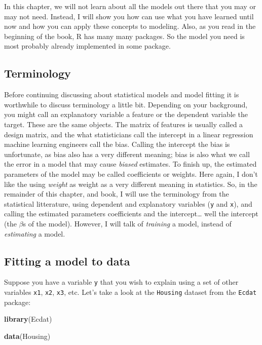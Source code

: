\documentclass[]{gitbook}
\newenvironment{Shaded}{\begin{snugshade}}{\end{snugshade}}
\newcommand{\KeywordTok}[1]{\textcolor[rgb]{0.13,0.29,0.53}{\textbf{#1}}}
\newcommand{\NormalTok}[1]{#1}
\theoremstyle{definition}
\theoremstyle{definition}
\theoremstyle{definition}
\theoremstyle{remark}
\begin{document}
In this chapter, we will not learn about all the models out there that
you may or may not need. Instead, I will show you how can use what you
have learned until now and how you can apply these concepts to modeling.
Also, as you read in the beginning of the book, R has many many
packages. So the model you need is most probably already implemented in
some package.

\hypertarget{terminology}{%
\subsection{Terminology}\label{terminology}}

Before continuing discussing about statistical models and model fitting
it is worthwhile to discuss terminology a little bit. Depending on your
background, you might call an explanatory variable a feature or the
dependent variable the target. These are the same objects. The matrix of
features is usually called a design matrix, and the what statisticians
call the intercept in a linear regression machine learning engineers
call the bias. Calling the intercept the bias is unfortunate, as bias
also has a very different meaning; bias is also what we call the error
in a model that may cause \emph{biased} estimates. To finish up, the
estimated parameters of the model may be called coefficients or weights.
Here again, I don't like the using \emph{weight} as weight as a very
different meaning in statistics. So, in the remainder of this chapter,
and book, I will use the terminology from the statistical litterature,
using dependent and explanatory variables (\texttt{y} and \texttt{x}),
and calling the estimated parameters coefficients and the
intercept\ldots{} well the intercept (the \(\beta\)s of the model).
However, I will talk of \emph{training} a model, instead of
\emph{estimating} a model.

\hypertarget{fitting-a-model-to-data}{%
\subsection{Fitting a model to data}\label{fitting-a-model-to-data}}

Suppose you have a variable \texttt{y} that you wish to explain using a
set of other variables \texttt{x1}, \texttt{x2}, \texttt{x3}, etc. Let's
take a look at the \texttt{Housing} dataset from the \texttt{Ecdat}
package:

\begin{Shaded}
\begin{Highlighting}[]
\KeywordTok{library}\NormalTok{(Ecdat)}

\KeywordTok{data}\NormalTok{(Housing)}
\end{Highlighting}
\end{Shaded}
\end{document}
